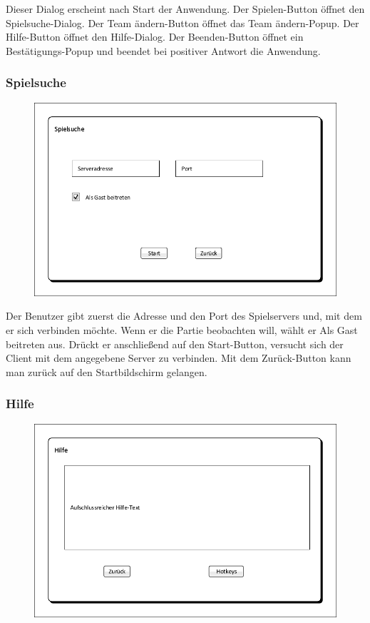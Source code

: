 Dieser Dialog erscheint nach Start der Anwendung. Der \glqq{}Spielen\grqq{}-Button öffnet den Spielsuche-Dialog. Der \glqq{}Team ändern\grqq{}-Button öffnet das \glqq{}Team ändern\grqq{}-Popup. Der \glqq{}Hilfe\grqq{}-Button öffnet den Hilfe-Dialog. Der \glqq{}Beenden\grqq{}-Button öffnet ein Bestätigungs-Popup und beendet bei positiver Antwort die Anwendung.

\subsubsection{Spielsuche}
\begin{figure}[H]
	\centering
	\includegraphics[scale=0.8]{images/Spielsuche.pdf}
\end{figure}

Der Benutzer gibt zuerst die Adresse und den Port des Spielservers und, mit dem er sich verbinden möchte. Wenn er die Partie beobachten will, wählt er \glqq{}Als Gast beitreten\grqq{} aus. Drückt er anschließend auf den \glqq{}Start\grqq{}-Button, versucht sich der Client mit dem angegebene Server zu verbinden. Mit dem \glqq{}Zurück\grqq{}-Button kann man zurück auf den Startbildschirm gelangen.
	
\subsubsection{Hilfe}
\begin{figure}[H]
	\centering
	\includegraphics[scale=0.8]{images/Hilfe.pdf}
\end{figure}

